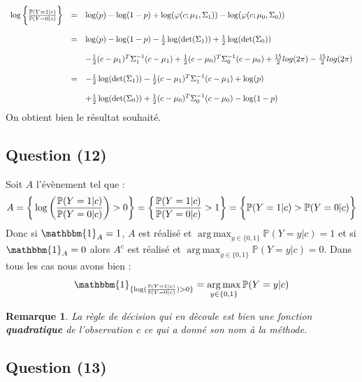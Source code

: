 \documentclass[10pt,a4paper]{report}\usepackage[]{graphicx}\usepackage[]{color}
\newtheorem*{rmq}{Remarque}
\DeclareMathOperator*{\argmax}{arg\,max}
\begin{document}
$$
\begin{array}{rcl}
\log \bigg{\{}\frac{\mathbb{P} (Y=1| c)}{\mathbb{P} (Y=0| c)} \bigg{\}} & = & \log(p) - \log(1-p) + \log(\varphi(c; \mu_1, \Sigma_1)) - \log(\varphi(c; \mu_0, \Sigma_0))  \\ \\ 
& = & \log(p) - \log(1-p) - \frac{1}{2}\log(\det(\Sigma_1)) + \frac{1}{2}\log(\det(\Sigma_0)) \\ \\ & & - \frac{1}{2}(c-\mu_1)^T \Sigma_1^{-1}(c-\mu_1) + \frac{1}{2}(c-\mu_0)^T \Sigma_0^{-1}(c-\mu_0) + \frac{15}{2}log(2\pi) - \frac{15}{2}log(2\pi) \\ \\ & = & - \frac{1}{2}\log(\det(\Sigma_1)) - \frac{1}{2}(c-\mu_1)^T \Sigma_1^{-1}(c-\mu_1) + \log(p) \\ \\ & & + \frac{1}{2}\log(\det(\Sigma_0)) + \frac{1}{2}(c-\mu_0)^T \Sigma_0^{-1}(c-\mu_0) - \log(1-p)
\end{array}
$$
On obtient bien le résultat souhaité.

\subsection{Question (12)} 

Soit $A$ l'évènement tel que : \[A = \bigg{\{} \log \bigg{(}\frac{\mathbb{P} (Y=1| c)}{\mathbb{P} (Y=0| c)} \bigg{)} > 0  \bigg{\}} = \bigg{\{} \frac{\mathbb{P} (Y=1| c)}{\mathbb{P} (Y=0| c)} > 1 \bigg{\}} = \bigg{\{} \mathbb{P} (Y=1| c) > \mathbb{P} (Y=0| c) \bigg{\}} \]
Donc si $\mathbbm{1}_A = 1$, $A$ est réalisé et $\argmax_{y\in \{0,1\}} \mathbb{P} (Y=y| c) = 1$ et si $\mathbbm{1}_A = 0$ alors $A^c$ est réalisé et $\argmax_{y\in \{0,1\}} \mathbb{P} (Y=y| c) = 0$. Dans tous les cas nous avons bien : 
\[ \mathbbm{1}_{\{ \log (\frac{\mathbb{P} (Y=1| c)}{\mathbb{P} (Y=0| c)} ) > 0\}} = \argmax_{y\in \{0,1\}} \mathbb{P} (Y=y| c) \]

\begin{rmq}
La règle de décision qui en dècoule est bien une fonction \textbf{quadratique} de l'observation $c$ ce qui a donné son nom à la méthode.
\end{rmq}

\subsection{Question (13)}
\end{document}
